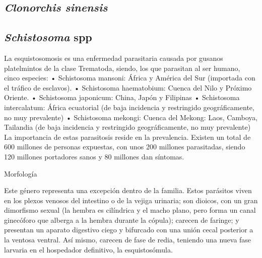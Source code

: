 \subsection{\textit{Clonorchis sinensis}}
\newpage
\subsection{\textit{Schistosoma} spp}
La esquistosomosis es una enfermedad parasitaria causada por gusanos platelmintos de la clase Trematoda, siendo, los que parasitan al ser humano, cinco especies:
• Schistosoma mansoni: África y América del Sur (importada con el tráfico de esclavos).
• Schistosoma haematobium: Cuenca del Nilo y Próximo Oriente.
• Schistosoma japonicum: China, Japón y Filipinas
• Schistosoma intercalatum: África ecuatorial (de baja incidencia y restringido geográficamente, no muy prevalente)
• Schistosoma mekongi: Cuenca del Mekong: Laos, Camboya, Tailandia (de baja incidencia y restringido geográficamente, no muy prevalente)
La importancia de estas parasitosis reside en la prevalencia. Existen un total de 600 millones de personas expuestas, con unos 200 millones parasitadas, siendo 120 millones portadores sanos y 80 millones dan síntomas.

Morfología

Este género representa una excepción dentro de la familia. Estos parásitos viven en los plexos venosos del intestino o de la vejiga urinaria; son dioicos, con un gran dimorfismo sexual (la hembra es cilíndrica y el macho plano, pero forma un canal ginecóforo que alberga a la hembra durante la cópula); carecen de faringe; y presentan un aparato digestivo ciego y bifurcado con una unión cecal posterior a la ventosa ventral. Así mismo, carecen de fase de redia, teniendo una nueva fase larvaria en el hospedador definitivo, la esquistosómula.

